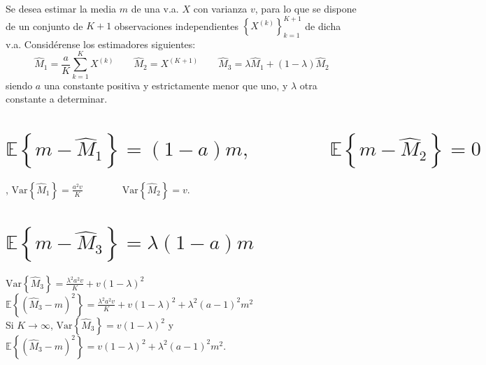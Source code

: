\ifspanish

\question Se desea estimar la media $m$ de una v.a. $X$ con varianza $v$, para lo que se dispone de un conjunto de $K+1$ observaciones independientes $\left\lbrace X^{(k)} \right\rbrace_{k=1}^{K+1} $  de dicha v.a. Considérense los estimadores siguientes:
$$ \hat{M}_1=\frac{a}{K} \sum_{k=1}^{K} {X^{(k)}}  \quad  \quad  \hat{M}_2=X^{(K+1)} \quad  \quad  \hat{M}_3= \lambda \hat{M}_1 + \left( 1- \lambda\right) \hat{M}_2 $$	 		 		 
siendo $a$ una constante positiva y estrictamente menor que uno, y $\lambda$  otra constante a determinar.

 
\begin{solution}
\begin{parts}
\part {$\mathbb E\left\{m - \hat{M}_1 \right\} = (1-a) m, \qquad \qquad
       \mathbb E\left\{m - \hat{M}_2 \right\} = 0$}, \newline
      $\text{Var}\left\{ \hat{M}_1 \right\} = \displaystyle\frac{a^2v}{K} \qquad \qquad
       \text{Var}\left\{ \hat{M}_2 \right\} = v$.
\part {$\mathbb E\left\{m - \hat{M}_3 \right\} = \lambda \left(1-a\right) m$} \hspace{1cm}
      $\text{Var}\left\{ \hat{M}_3 \right\} = \displaystyle\frac{\lambda^2 a^2v}{K}+v\left( 1-\lambda\right)^2 $\\
      $\mathbb E\left\{\left( \hat{M}_3 - m \right)^2 \right\} = \displaystyle\frac{\lambda^2 a^2v}{K}+v\left( 1-\lambda\right)^2 +  \lambda^2 \left(a-1 \right)^2 m^2$ \\

Si $K\longrightarrow \infty$, $\text{Var} \left\{ \hat{M}_3 \right\} = v\left( 1-\lambda\right)^2 $ y 
$\mathbb E\left\{ \left( \hat{M}_3 - m \right)^2 \right\} = v\left( 1-\lambda\right)^2 +   \lambda^2 \left(a-1 \right)^2 m^2$.
\end{parts}
\end{solution}

